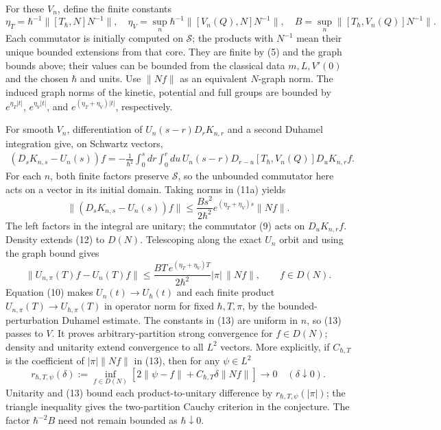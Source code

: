 \documentclass[11pt,a4paper]{article}
\begin{document}
For these \(V_n\), define the finite constants \[
 \eta_T=\hbar^{-1}\|[T_\hbar,N]N^{-1}\|,\quad
 \eta_V=\sup_n\hbar^{-1}\|[V_n(Q),N]N^{-1}\|,\quad
 B=\sup_n\|[T_\hbar,V_n(Q)]N^{-1}\|.\tag{11}
\] Each commutator is initially computed on \(\mathcal S\); the products
with \(N^{-1}\) mean their unique bounded extensions from that core.
They are finite by (5) and the graph bounds above; their values can be
bounded from the classical data \(m,L,V'(0)\) and the chosen \(\hbar\)
and units. Use \(\|Nf\|\) as an equivalent \(N\)-graph norm. The induced
graph norms of the kinetic, potential and full groups are bounded by
\(e^{\eta_T|t|}\), \(e^{\eta_V|t|}\), and \(e^{(\eta_T+\eta_V)|t|}\),
respectively.

For smooth \(V_n\), differentiation of \(U_n(s-r)D_rK_{n,r}\) and a
second Duhamel integration give, on Schwartz vectors, \[
 \begin{aligned}
 (D_sK_{n,s}-U_n(s))f
 =-\frac1{\hbar^2}\int_0^s\!dr\int_0^r\!du\,
 U_n(s-r)D_{r-u}[T_\hbar,V_n(Q)]D_uK_{n,r}f.
 \end{aligned}\tag{11a}
\] For each \(n\), both finite factors preserve \(\mathcal S\), so the
unbounded commutator here acts on a vector in its initial domain. Taking
norms in (11a) yields \[
 \|(D_sK_{n,s}-U_n(s))f\|
 \le\frac{Bs^2}{2\hbar^2}
       e^{(\eta_T+\eta_V)s}\|Nf\|.\tag{12}
\] The left factors in the integral are unitary; the commutator (9) acts
on \(D_uK_{n,r}f\). Density extends (12) to \(D(N)\). Telescoping along
the exact \(U_n\) orbit and using the graph bound gives \[
 \|U_{n,\pi}(T)f-U_n(T)f\|
 \le\frac{BT\,e^{(\eta_T+\eta_V)T}}{2\hbar^2}
      |\pi|\,\|Nf\|,\qquad f\in D(N).\tag{13}
\] Equation (10) makes \(U_n(t)\to U_\hbar(t)\) and each finite product
\(U_{n,\pi}(T)\to U_{\hbar,\pi}(T)\) in operator norm for fixed
\(\hbar,T,\pi\), by the bounded-perturbation Duhamel estimate. The
constants in (13) are uniform in \(n\), so (13) passes to \(V\). It
proves arbitrary-partition strong convergence for \(f\in D(N)\); density
and unitarity extend convergence to all \(L^2\) vectors. More
explicitly, if \(C_{\hbar,T}\) is the coefficient of \(|\pi|\|Nf\|\) in
(13), then for any \(\psi\in L^2\) \[
 r_{\hbar,T,\psi}(\delta):=
 \inf_{f\in D(N)}\left[2\|\psi-f\|
              +C_{\hbar,T}\delta\|Nf\|\right]
 \longrightarrow0\quad(\delta\downarrow0).\tag{13a}
\] Unitarity and (13) bound each product-to-unitary difference by
\(r_{\hbar,T,\psi}(|\pi|)\); the triangle inequality gives the
two-partition Cauchy criterion in the conjecture. The factor
\(\hbar^{-2}B\) need not remain bounded as \(\hbar\downarrow0\).
\end{document}
